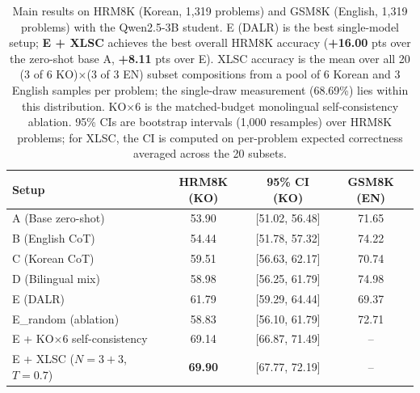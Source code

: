 \documentclass{article}
\begin{document}
\begin{table}[t]
\centering
\small
\begin{tabular}{lccc}
\toprule
\textbf{Setup} & \textbf{HRM8K (KO)} & \textbf{95\% CI (KO)} & \textbf{GSM8K (EN)} \\
\midrule
A (Base zero-shot)           & 53.90          & [51.02, 56.48] & 71.65 \\
B (English CoT)              & 54.44          & [51.78, 57.32] & 74.22 \\
C (Korean CoT)               & 59.51          & [56.63, 62.17] & 70.74 \\
D (Bilingual mix)            & 58.98          & [56.25, 61.79] & 74.98 \\
E (DALR)                     & 61.79          & [59.29, 64.44] & 69.37 \\
E\_random (ablation)         & 58.83          & [56.10, 61.79] & 72.71 \\
\midrule
E + KO$\times$6 self-consistency      & 69.14          & [66.87, 71.49] & --    \\
E + XLSC ($N{=}3{+}3$, $T{=}0.7$)     & \textbf{69.90} & [67.77, 72.19] & --    \\
\bottomrule
\end{tabular}
\caption{Main results on HRM8K (Korean, 1,319 problems) and GSM8K
(English, 1,319 problems) with the Qwen2.5-3B student. E (DALR) is
the best single-model setup; \textbf{E + XLSC} achieves the best
overall HRM8K accuracy (\textbf{+16.00} pts over the zero-shot base
A, \textbf{+8.11} pts over E). XLSC accuracy is the mean over all 20
(3 of 6 KO)$\times$(3 of 3 EN) subset compositions from a pool of 6
Korean and 3 English samples per problem; the single-draw measurement
(68.69\%) lies within this distribution. KO$\times$6 is the
matched-budget monolingual self-consistency ablation. 95\% CIs are
bootstrap intervals (1{,}000 resamples) over HRM8K problems; for
XLSC, the CI is computed on per-problem expected correctness averaged
across the 20 subsets.}
\label{tab:main}
\end{table}
\end{document}
